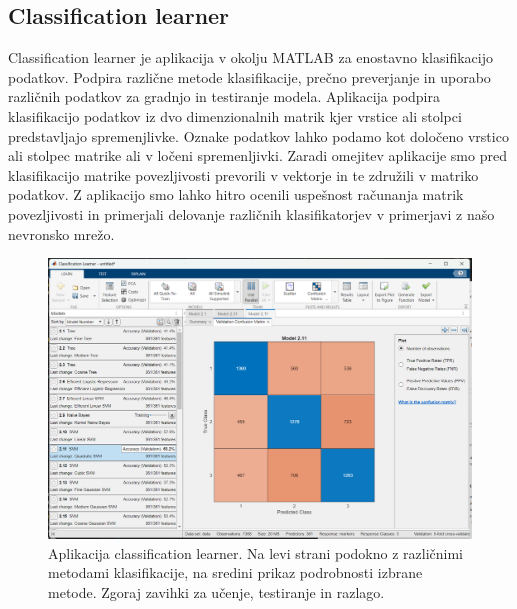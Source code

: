 \subsection{Classification learner}
Classification learner je aplikacija v okolju MATLAB za enostavno klasifikacijo podatkov. Podpira različne metode klasifikacije, prečno preverjanje in uporabo različnih podatkov za gradnjo in testiranje modela. Aplikacija podpira klasifikacijo podatkov iz dvo dimenzionalnih matrik kjer vrstice ali stolpci predstavljajo spremenjlivke. Oznake podatkov lahko podamo kot določeno vrstico ali stolpec matrike ali v ločeni spremenljivki. Zaradi omejitev aplikacije smo pred klasifikacijo matrike povezljivosti prevorili v vektorje in te združili v matriko podatkov. Z aplikacijo smo lahko hitro ocenili uspešnost računanja matrik povezljivosti in primerjali delovanje različnih klasifikatorjev v primerjavi z našo nevronsko mrežo.
\begin{figure}[h!]
    \begin{center}
    \includegraphics[width=1\linewidth]{slike/ClasificationLearner.png}
    \end{center}
    \caption{Aplikacija classification learner. Na levi strani podokno z različnimi metodami klasifikacije, na sredini prikaz podrobnosti izbrane metode. Zgoraj zavihki za učenje, testiranje in razlago. }
    \end{figure}

